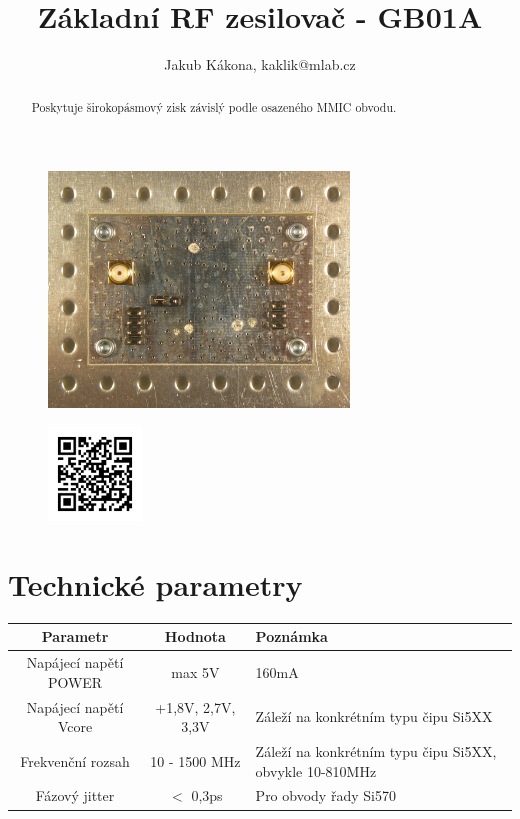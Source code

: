 \documentclass[12pt,a4paper,oneside]{article}
\begin{document}
\title{Základní RF zesilovač - GB01A}
\author{Jakub Kákona, kaklik@mlab.cz}
\maketitle

\thispagestyle{empty}
\begin{abstract}
Poskytuje širokopásmový zisk závislý podle osazeného MMIC obvodu.
\end{abstract}

\begin{figure} [htbp]
\begin{center}
\includegraphics [width=80mm] {./img/GB01A_Top_Big.JPG} 
\end{center}
\end{figure}

\begin{figure} [b]
\includegraphics [width=25mm] {./img/GB01A_QRcode.png} 
\end{figure}

\newpage
\tableofcontents

\section{Technické parametry}
\begin{table}[htbp]
\begin{center}
\begin{tabular}{|c|c|p{4.7cm}|}
\hline
Parametr & Hodnota & Poznámka \\
\hline
Napájecí napětí POWER  & max 5V &  160mA \\ 
\hline
Napájecí napětí Vcore & +1,8V, 2,7V, 3,3V &  Záleží na konkrétním typu čipu Si5XX \\ 
\hline
Frekvenční rozsah  & 10 - 1500 MHz & Záleží na konkrétním typu čipu Si5XX, obvykle 10-810MHz \\ 
\hline
Fázový jitter  & $<$ 0,3ps & Pro obvody řady Si570 \\ 
\hline
\end{tabular}
\end{center}
\end{table}
\end{document}
